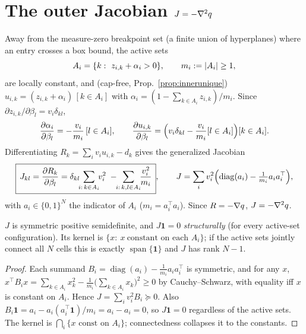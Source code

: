 \documentclass[11pt,a4paper]{article}
\begin{document}
\section{The outer Jacobian \texorpdfstring{$J=-\nabla^2 q$}{J = -Hess q}}
\label{sec:jacobian}
Away from the measure-zero breakpoint set (a finite union of hyperplanes) where an entry
crosses a box bound, the active sets
\begin{equation}
  A_i=\{k:\ z_{i,k}+\alpha_i>0\},\qquad m_i:=\left|A_i\right|\ge1,
\end{equation}
are locally constant, and (cap-free, Prop.~\ref{prop:innerunique})
$u_{i,k}=(z_{i,k}+\alpha_i)\,[k\in A_i]$ with $\alpha_i=(1-\sum_{k\in A_i}z_{i,k})/m_i$. Since
$\partial z_{i,k}/\partial\beta_l=v_i\delta_{kl}$,
\begin{equation}
  \dfrac{\partial \alpha_i}{\partial \beta_l}=-\frac{v_i}{m_i}\,[l\in A_i],\qquad
  \dfrac{\partial u_{i,k}}{\partial \beta_l}=\Bigl(v_i\delta_{kl}-\frac{v_i}{m_i}[l\in A_i]\Bigr)[k\in A_i].
  \label{eq:dudbeta}
\end{equation}
Differentiating $R_k=\sum_i v_i u_{i,k}-d_k$ gives the generalized Jacobian
\begin{equation}
  \boxed{\,J_{kl}=\pd{R_k}{\beta_l}
   =\delta_{kl}\!\!\sum_{i:\,k\in A_i}\!\! v_i^2
   \;-\!\!\sum_{i:\,k,l\in A_i}\!\!\frac{v_i^2}{m_i}\,},\qquad
  J=\sum_i v_i^2\Bigl(\operatorname{diag}(a_i)-\tfrac{1}{m_i}a_i a_i^\top\Bigr),
  \label{eq:jacobian}
\end{equation}
with $a_i\in\{0,1\}^N$ the indicator of $A_i$ ($m_i=a_i^\top a_i$). Since $R=-\nabla q$,
$J=-\nabla^2 q$.

\begin{prop}[structure of $J$]
\label{prop:J}
$J$ is symmetric positive semidefinite, and $J\mathbf 1=0$ \emph{structurally} (for every
active-set configuration). Its kernel is $\{x:\ x\ \text{constant on each }A_i\}$; if the
active sets jointly connect all $N$ cells this is exactly $\operatorname{span}\{\mathbf 1\}$
and $J$ has rank $N-1$.
\end{prop}
\begin{proof}
Each summand $B_i=\operatorname{diag}(a_i)-\tfrac1{m_i}a_ia_i^\top$ is symmetric, and for any
$x$, $x^\top B_i x=\sum_{k\in A_i}x_k^2-\tfrac1{m_i}\bigl(\sum_{k\in A_i}x_k\bigr)^2\ge0$ by
Cauchy--Schwarz, with equality iff $x$ is constant on $A_i$. Hence $J=\sum_i v_i^2 B_i\succeq0$.
Also $B_i\mathbf 1=a_i-a_i(a_i^\top\mathbf 1)/m_i=a_i-a_i=0$, so $J\mathbf 1=0$ regardless of
the active sets. The kernel is $\bigcap_i\{x\text{ const on }A_i\}$; connectedness collapses it
to the constants.
\end{proof}
\end{document}
